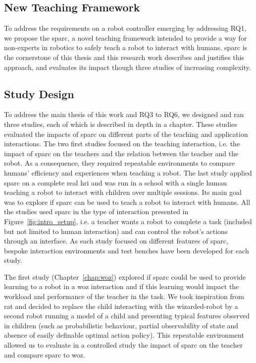 \subsection{New Teaching Framework}
To address the requirements on a robot controller emerging by addressing RQ1, we propose the \gls{sparc}, a novel teaching framework intended to provide a way for non-experts in robotics to safely teach a robot to interact with humans. \gls{sparc} is the cornerstone of this thesis and this research work describes and justifies this approach, and evaluates its impact though three studies of increasing complexity.

\subsection{Study Design} 

To address the main thesis of this work and RQ3 to RQ6, we designed and ran three studies, each of which is described in depth in a chapter. These studies evaluated the impacts of \gls{sparc} on different parts of the teaching and application interactions. The two first studies focused on the teaching interaction, i.e. the impact of \gls{sparc} on the teachers and the relation between the teacher and the robot. As a consequence, they required repeatable environments to compare humans' efficiency and experiences when teaching a robot. The last study applied \gls{sparc} on a complete real \gls{hri} and was run in a school with a single human teaching a robot to interact with children over multiple sessions. Its main goal was to explore if \gls{sparc} can be used to teach a robot to interact with humans. All the studies used \gls{sparc} in the type of interaction presented in Figure~\ref{fig:intro_setup}, i.e. a teacher wants a robot to complete a task (included but not limited to human interaction) and can control the robot's actions through an interface. As each study focused on different features of \gls{sparc}, bespoke interaction environments and test benches have been developed for each study.

The first study (Chapter~\ref{chap:woz}) explored if \gls{sparc} could be used to provide learning to a robot in a \gls{woz} interaction and if this learning would impact the workload and performance of the teacher in the task. We took inspiration from \gls{rat} and decided to replace the child interacting with the wizarded-robot by a second robot running a model of a child and presenting typical features observed in children (such as probabilistic behaviour, partial observability of state and absence of easily definable optimal action policy). This repeatable environment allowed us to evaluate in a controlled study the impact of \gls{sparc} on the teacher and compare \gls{sparc} to \gls{woz}.

